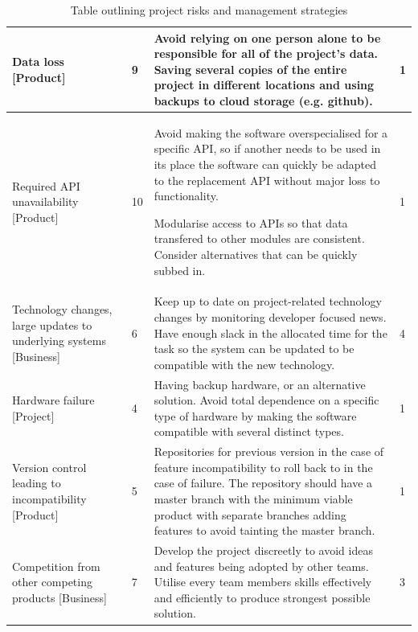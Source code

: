 \documentclass[]{IEEEtran}
\begin{document}
\begin{table}[h]
\begin{tabular}{| m{4cm} | m{1cm} | m{9.5cm} | m{1.5cm} | }
		\hline
		
		Data loss [Product] & 
		9 &
		Avoid relying on one person alone to be responsible for all of the project's data. Saving several copies of the entire project in different locations and using backups to cloud storage (e.g. github). & 
		1 \\
		
		\hline
		
		Required API unavailability [Product] & 
		10 & 
		Avoid making the software overspecialised for a specific API, so if another needs to be used in its place the software can quickly be adapted to the replacement API without major loss to functionality. 
		
	Modularise access to APIs so that data transfered to other modules are consistent. Consider alternatives that can be quickly subbed in. & 
		1 \\
		
		\hline 
		
		Technology changes, large updates to underlying systems [Business] & 
		6 & 
		Keep up to date on project-related technology changes by monitoring developer focused news. Have enough slack in the allocated time for the task so the system can be updated to be compatible with the new technology. & 
		4 \\
		
		\hline
		
		Hardware failure [Project] & 
		4 & 
		Having backup hardware, or an alternative solution. Avoid total dependence on a specific type of hardware by making the software compatible with several distinct types. &
		1 \\
		
		\hline
		
		Version control leading to incompatibility [Product] & 
		5 & 
		Repositories for previous version in the case of feature incompatibility to roll back to in the case of failure. The repository should have a master branch with the minimum viable product with separate branches adding features to avoid tainting the master branch. & 
		1 \\
		
		\hline
		
		Competition from other competing products [Business] & 
		7 & 
		Develop the project discreetly to avoid ideas and features being adopted by other teams. Utilise every team members skills effectively and efficiently to produce strongest possible solution. & 
		3 \\
		
		\hline
		
	\end{tabular}
	\caption{Table outlining project risks and management strategies}
\end{table}
	\newpage
\end{document}
